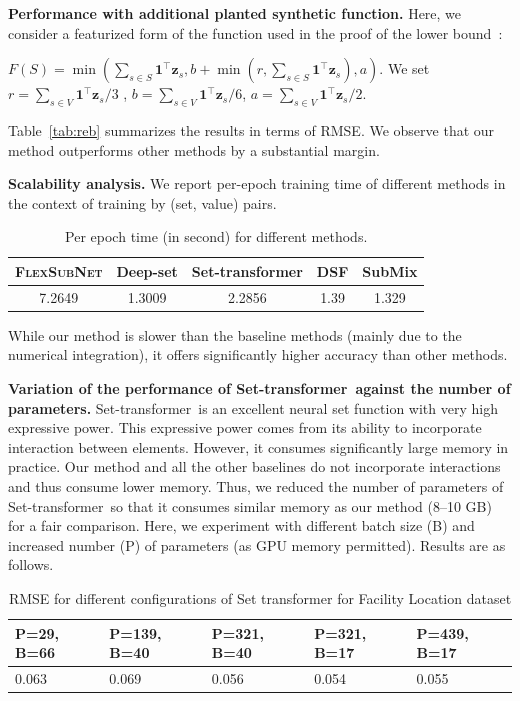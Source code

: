 \documentclass{article}
\newcommand{\our}{\textsc{Flex\-Sub\-Net}}
\newcommand{\xhdr}[1]{\noindent\textbf{#1.}}
\renewcommand{\cite}{\citep}
\newcommand{\deepset}{Deep-set}
\newcommand{\settx}{Set-transformer}
\begin{document}
\xhdr{Performance with additional planted synthetic function}
%
Here, we consider a featurized form of the function used in the proof of the lower bound~\cite{reb}:

$F(S) = \min(\sum_{s\in S} \pmb{1}^{\top} \pmb{z}_s,  b+\min(r , \sum_{s\in S}\pmb{1}^{\top} \pmb{z}_s),a)$.
We set $r = \sum_{s\in V} \pmb{1}^{\top} \pmb{z}_s / 3$ ,  $b =  \sum_{s\in V} \pmb{1}^{\top} \pmb{z}_s / 6$, $a =   \sum_{s\in V} \pmb{1}^{\top} \pmb{z}_s / 2$.


Table~\ref{tab:reb} summarizes the results in terms of RMSE. We observe that our method outperforms other methods by a substantial margin. 

\xhdr{Scalability analysis}
We report per-epoch training time of different methods in the context of training by (set, value) pairs.


\begin{table}[h]
    \centering
    \begin{tabular}{ c|c|c|c|c }
    \hline
        \our & \deepset & \settx & DSF & SubMix \\ \hline
        7.2649 & 1.3009 & 2.2856 & 1.39 & 1.329 \\ \hline
    \end{tabular}
    \caption{Per epoch time (in second) for different methods.}
\end{table}

While our method is slower than the baseline methods (mainly due to the numerical integration), it offers significantly higher accuracy than other methods. 
 

\xhdr{Variation of the performance of \settx\ against the number of parameters} \settx\ is an excellent neural set function with very high expressive power. This expressive power comes from its ability to incorporate interaction between elements. However, it consumes significantly large memory in practice.  Our method and all the other baselines do not incorporate interactions and thus consume lower memory. Thus, we reduced the number of parameters of \settx\ so that it consumes similar memory as our method (8--10 GB) for a fair comparison. 
Here, we experiment with different batch size (B) and increased number (P) of parameters  (as GPU memory permitted).  Results are as follows.

\begin{table}[h]
    \centering
    \begin{tabular}{l|l|l|l|l}
    \hline
        P=29, B=66 & P=139, B=40 & P=321, B=40 & P=321, B=17 & P=439, B=17 \\ \hline
        0.063 & 0.069 & 0.056 & 0.054 & 0.055 \\ \hline
    \end{tabular}
    \caption{RMSE for different configurations of Set transformer for Facility Location dataset}
\end{table}
\end{document}
